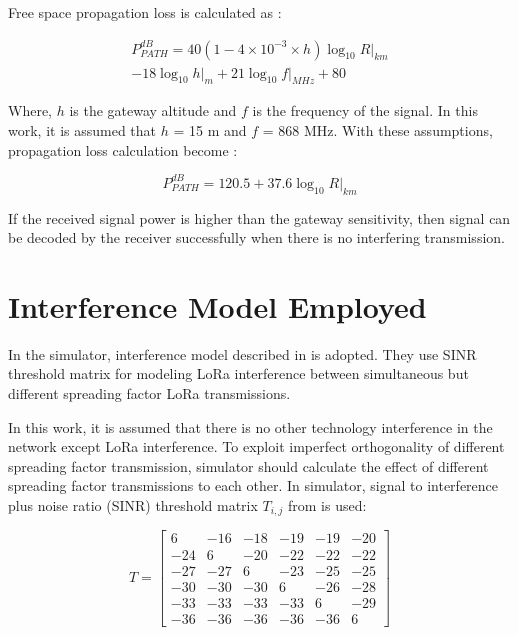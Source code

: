 Free space propagation loss is calculated as \cite{TR136.942}:

\begin{equation} \label{eq:propagation_loss}
\begin{split}
P^{dB}_{PATH} = 40(1 - 4 \times 10^{-3} \times h){\log_{10} R|_{km}} \\
- 18 {\log_{10} h|_{m}} + 21 {\log_{10} f|_{MHz}} + 80
\end{split}
\end{equation}

Where, $h$ is the gateway altitude and $f$ is the frequency of the signal. In this work, it is assumed that $h$ = 15 m and $f$ = 868 MHz. With these assumptions, propagation loss calculation become \cite{7996384}:

\begin{equation} \label{eq:propagation_loss_simplified}
P^{dB}_{PATH} = 120.5 + 37.6 {\log_{10} R|_{km}}
\end{equation}

If the received signal power is higher than the gateway sensitivity, then signal can be decoded by the receiver successfully when there is no interfering transmission.

\section{Interference Model Employed}

In the simulator, interference model described in \cite{7996384} is adopted. They use SINR threshold matrix for modeling LoRa interference between simultaneous but different spreading factor LoRa transmissions.

In this work, it is assumed that there is no other technology interference in the network except LoRa interference. To exploit imperfect orthogonality of different spreading factor transmission, simulator should calculate the effect of different spreading factor transmissions to each other. In simulator, signal to interference plus noise ratio (SINR) threshold matrix $T_{i,j}$ from \cite{goursaud:hal-01231221} is used:

\begin{equation} \label{eq:sinr}	
T = \begin{bmatrix}	
       6 & -16 & -18 & -19 & -19 & -20 \\	
     -24 &   6 & -20 & -22 & -22 & -22 \\	
     -27 & -27 &   6 & -23 & -25 & -25 \\	
     -30 & -30 & -30 &   6 & -26 & -28 \\	
     -33 & -33 & -33 & -33 &   6 & -29 \\	
     -36 & -36 & -36 & -36 & -36 &   6	
     \end{bmatrix}	
\end{equation}

